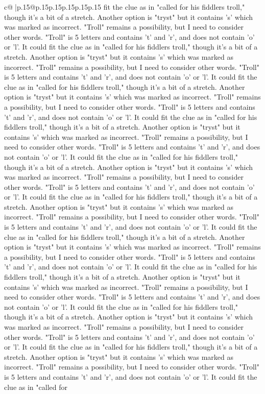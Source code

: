 \documentclass{article}
\begin{document}
{\begin{supertabular}{c@{$\;$}|p{.15\linewidth}@{}p{.15\linewidth}p{.15\linewidth}p{.15\linewidth}p{.15\linewidth}p{.15\linewidth}}
{{{fit the clue as in "called for his fiddlers troll," though it's a bit of a stretch. Another option is "tryst" but it contains 's' which was marked as incorrect. "Troll" remains a possibility, but I need to consider other words. "Troll" is 5 letters and contains 't' and 'r', and does not contain 'o' or 'l'. It could fit the clue as in "called for his fiddlers troll," though it's a bit of a stretch. Another option is "tryst" but it contains 's' which was marked as incorrect. "Troll" remains a possibility, but I need to consider other words. "Troll" is 5 letters and contains 't' and 'r', and does not contain 'o' or 'l'. It could fit the clue as in "called for his fiddlers troll," though it's a bit of a stretch. Another option is "tryst" but it contains 's' which was marked as incorrect. "Troll" remains a possibility, but I need to consider other words. "Troll" is 5 letters and contains 't' and 'r', and does not contain 'o' or 'l'. It could fit the clue as in "called for his fiddlers troll," though it's a bit of a stretch. Another option is "tryst" but it contains 's' which was marked as incorrect. "Troll" remains a possibility, but I need to consider other words. "Troll" is 5 letters and contains 't' and 'r', and does not contain 'o' or 'l'. It could fit the clue as in "called for his fiddlers troll," though it's a bit of a stretch. Another option is "tryst" but it contains 's' which was marked as incorrect. "Troll" remains a possibility, but I need to consider other words. "Troll" is 5 letters and contains 't' and 'r', and does not contain 'o' or 'l'. It could fit the clue as in "called for his fiddlers troll," though it's a bit of a stretch. Another option is "tryst" but it contains 's' which was marked as incorrect. "Troll" remains a possibility, but I need to consider other words. "Troll" is 5 letters and contains 't' and 'r', and does not contain 'o' or 'l'. It could fit the clue as in "called for his fiddlers troll," though it's a bit of a stretch. Another option is "tryst" but it contains 's' which was marked as incorrect. "Troll" remains a possibility, but I need to consider other words. "Troll" is 5 letters and contains 't' and 'r', and does not contain 'o' or 'l'. It could fit the clue as in "called for his fiddlers troll," though it's a bit of a stretch. Another option is "tryst" but it contains 's' which was marked as incorrect. "Troll" remains a possibility, but I need to consider other words. "Troll" is 5 letters and contains 't' and 'r', and does not contain 'o' or 'l'. It could fit the clue as in "called for his fiddlers troll," though it's a bit of a stretch. Another option is "tryst" but it contains 's' which was marked as incorrect. "Troll" remains a possibility, but I need to consider other words. "Troll" is 5 letters and contains 't' and 'r', and does not contain 'o' or 'l'. It could fit the clue as in "called for his fiddlers troll," though it's a bit of a stretch. Another option is "tryst" but it contains 's' which was marked as incorrect. "Troll" remains a possibility, but I need to consider other words. "Troll" is 5 letters and contains 't' and 'r', and does not contain 'o' or 'l'. It could fit the clue as in "called for }}}
\end{supertabular}}
\end{document}
